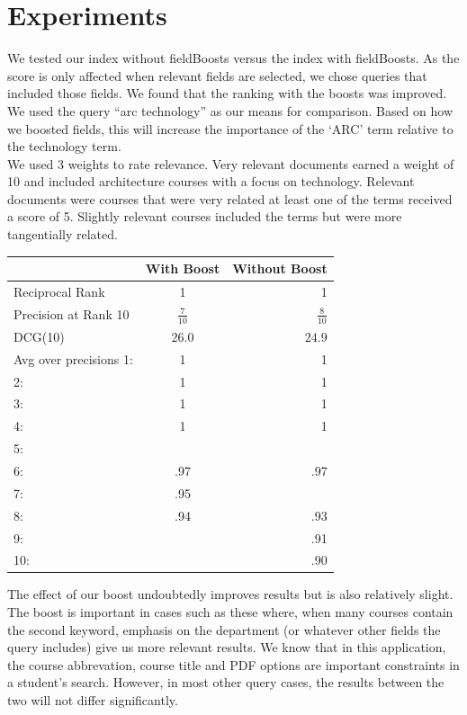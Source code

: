 \documentclass[12pt,letterpaper]{article}
\begin{document}
\section{Experiments}

We tested our index without fieldBoosts versus the index with fieldBoosts. As the score is only affected when relevant fields are selected, we chose queries that included those fields. We found that the ranking with the boosts was improved. We used the query ``arc technology'' as our means for comparison. Based on how we boosted fields, this will increase the importance of the `ARC' term relative to the technology term. \\

We used 3 weights to rate relevance. Very relevant documents earned a weight of 10 and included architecture courses with a focus on technology. Relevant documents were courses that were very related at least one of the terms received a score of 5. Slightly relevant courses included the terms but were more tangentially related. 

\begin{tabular}{ | l | c | r |}
	\hline
		& With Boost & Without Boost\\
	\hline
	Reciprocal Rank 			 & 1 & 1\\
	Precision at Rank 10 & $\frac{7}{10}$ & $\frac{8}{10}$ \\
	DCG(10) 								& $26.0$ & $24.9$ \\
	Avg over precisions 1: & 1 	& 1 \\
	2: 										& 1 	& 1 \\
	3: 										& 1 	& 1 \\
	4: 										& 1 	& 1 \\
	5: 										& 		&   \\
	6: 										& .97 & .97\\
	7: 										& .95 & 	 \\
	8: 										& .94 & .93 \\
	9: 										& 		& .91 \\
	10: 									&	 		& .90 \\	
	\hline 
\end{tabular}

\vspace{1 cm}

The effect of our boost undoubtedly improves results but is also relatively slight. The boost is important in cases such as these where, when many courses contain the second keyword, emphasis on the department (or whatever other fields the query includes) give us more relevant results. We know that in this application, the course abbrevation, course title and PDF options are important constraints in a student's search. However, in most other query cases, the results between the two will not differ significantly. 
\end{document}
